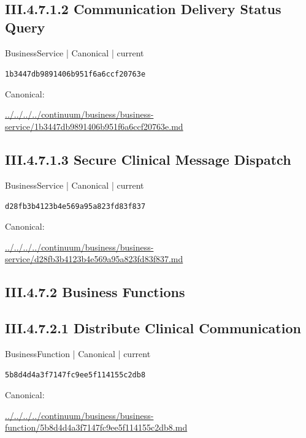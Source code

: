 \documentclass[10pt,a4paper]{article}
\begin{document}
\subsection*{III.4.7.1.2 Communication Delivery Status Query}
{\small BusinessService | Canonical | current}\par
\texttt{1b3447db9891406b951f6a6ccf20763e}\par
Canonical: \par
{\footnotesize\url{../../../../continuum/business/business-service/1b3447db9891406b951f6a6ccf20763e.md}}\par
\subsection*{III.4.7.1.3 Secure Clinical Message Dispatch}
{\small BusinessService | Canonical | current}\par
\texttt{d28fb3b4123b4e569a95a823fd83f837}\par
Canonical: \par
{\footnotesize\url{../../../../continuum/business/business-service/d28fb3b4123b4e569a95a823fd83f837.md}}\par
\subsection*{III.4.7.2 Business Functions}
\subsection*{III.4.7.2.1 Distribute Clinical Communication}
{\small BusinessFunction | Canonical | current}\par
\texttt{5b8d4d4a3f7147fc9ee5f114155c2db8}\par
Canonical: \par
{\footnotesize\url{../../../../continuum/business/business-function/5b8d4d4a3f7147fc9ee5f114155c2db8.md}}\par
\end{document}
